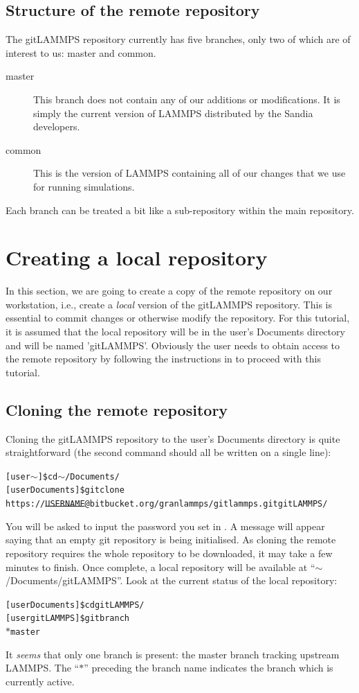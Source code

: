\documentclass[a4paper,oneside,11pt]{article}
\begin{document}
\subsection{Structure of the remote repository}\label{ssec:srr}
The gitLAMMPS repository currently has five branches, only two of which are of interest to us: master and common.
\begin{description}
  \item[master] This branch does not contain any of our additions or modifications. It is simply the current version of LAMMPS distributed by the Sandia developers.
  \item[common] This is the version of LAMMPS containing all of our changes that we use for running simulations.
\end{description}
Each branch can be treated a bit like a sub-repository within the main repository.

\section{Creating a local repository}\label{sec:clr}
In this section, we are going to create a copy of the remote repository on our workstation, i.e., create a \emph{local} version of the gitLAMMPS repository. This is essential to commit changes or otherwise modify the repository. For this tutorial, it is assumed that the local repository will be in the user's Documents directory and will be named 'gitLAMMPS'. Obviously the user needs to obtain access to the remote repository by following the instructions in  to proceed with this tutorial.

\subsection{Cloning the remote repository}\label{ssec:crr}
Cloning the gitLAMMPS repository to the user's Documents directory is quite straightforward (the second command should all be written on a single line):
\begin{alltt}
[user \(\sim\)]\$ cd \(\sim\)/Documents/
[user Documents]\$ git clone 
  \hspace{5em} https://\sout{USERNAME}@bitbucket.org/granlammps/gitlammps.git gitLAMMPS/
\end{alltt}
You will be asked to input the password you set in . A message will appear saying that an empty git repository is being initialised. As cloning the remote repository requires the whole repository to be downloaded, it may take a few minutes to finish. Once complete, a local repository will be available at ``$\sim$\slash Documents\slash gitLAMMPS''. Look at the current status of the local repository:
\begin{alltt}
[user Documents]\$ cd gitLAMMPS/
[user gitLAMMPS]\$ git branch
\(\ast\) master
\end{alltt}
It \emph{seems} that only one branch is present: the master branch tracking upstream LAMMPS. The ``$\ast$'' preceding the branch name indicates the branch which is currently active. 
\end{document}
